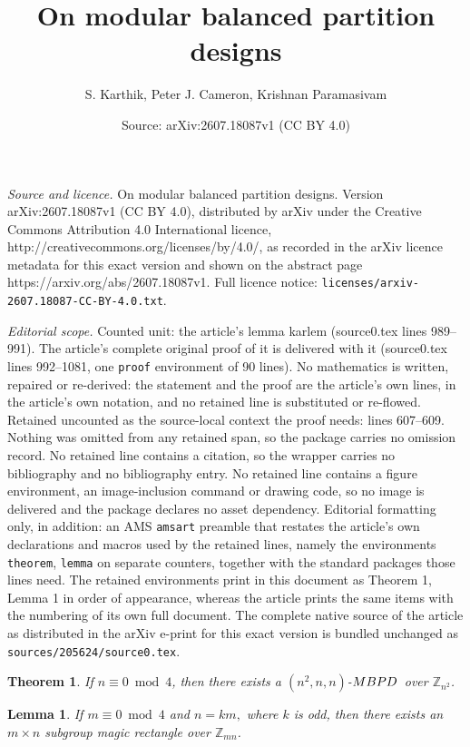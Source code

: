\documentclass[10pt,a4paper]{amsart}
\title{On modular balanced partition designs}
\author{S. Karthik, Peter J. Cameron, Krishnan Paramasivam}
\date{Source: arXiv:2607.18087v1 (CC BY 4.0)}
\newtheorem{theorem}{Theorem}
\newtheorem{lemma}{Lemma}
\newcommand{\MBPD}{\textnormal{MBPD}}
\begin{document}
\maketitle

\noindent\emph{Source and licence.} On modular balanced partition designs. Version arXiv:2607.18087v1 (CC BY 4.0), distributed by arXiv under the Creative Commons Attribution 4.0 International licence, http://creativecommons.org/licenses/by/4.0/, as recorded in the arXiv licence metadata for this exact version and shown on the abstract page https://arxiv.org/abs/2607.18087v1. Full licence notice: \texttt{licenses/arxiv-2607.18087-CC-BY-4.0.txt}.\par\smallskip

\noindent\textit{Editorial scope.} Counted unit: the article's lemma karlem (source0.tex lines 989--991). The article's complete original proof of it is delivered with it (source0.tex lines 992--1081, one \texttt{proof} environment of 90 lines). No mathematics is written, repaired or re-derived: the statement and the proof are the article's own lines, in the article's own notation, and no retained line is substituted or re-flowed.  Retained uncounted as the source-local context the proof needs: lines 607--609.  Nothing was omitted from any retained span, so the package carries no omission record.  No retained line contains a citation, so the wrapper carries no bibliography and no bibliography entry.  No retained line contains a figure environment, an image-inclusion command or drawing code, so no image is delivered and the package declares no asset dependency.  Editorial formatting only, in addition: an AMS \texttt{amsart} preamble that restates the article's own declarations and macros used by the retained lines, namely the environments \texttt{theorem}, \texttt{lemma} on separate counters, together with the standard packages those lines need.  The retained environments print in this document as Theorem 1, Lemma 1 in order of appearance, whereas the article prints the same items with the numbering of its own full document.  The complete native source of the article as distributed in the arXiv e-print for this exact version is bundled unchanged as \texttt{sources/205624/source0.tex}.
\begin{theorem}{\label{thmkar}}
      If $n\equiv  0 \bmod{4}$, then there exists a $(n^2,n ,n)$-$\MBPD$~over $\mathbb{Z}_{n^2}$.
\end{theorem}

\begin{lemma}\label{karlem}
   If $m\equiv 0\bmod{4}$ and $n=km,$ where $k$ is odd, then there exists an $m\times n$ subgroup magic rectangle over $\mathbb{Z}_{mn}$.
\end{lemma}
\end{document}
